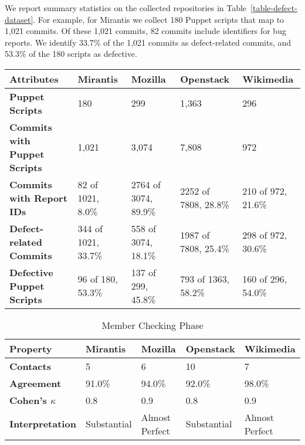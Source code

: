 \documentclass[smallextended]{svjour3}       %
\begin{document}

We report summary statistics on the collected repositories in Table~\ref{table-defect-dataset}. For example, for Mirantis we collect 180 Puppet scripts that map to 1,021 commits. Of these 1,021 commits, 82 commits include identifiers for bug reports. We identify 33.7\% of the 1,021 commits as defect-related commits, and 53.3\% of the 180 scripts as defective.   

\begin{table*}[]
\centering
\caption{Statistics of Four Datasets}
\label{table-defect-dataset}
{\footnotesize
\begin{tabular}{ p{2.5cm} p{1.8cm} p{1.8cm} p{1.8cm} p{1.8cm} }
\hline
\textbf{Attributes}  & Mirantis & Mozilla & Openstack & Wikimedia \\
\hline
\textbf{Puppet Scripts} & 180 & 299  & 1,363 & 296 \\
\textbf{Commits with Puppet Scripts} & 1,021  & 3,074  & 7,808  & 972  \\
\textbf{Commits with Report IDs} & 82  of 1021, 8.0\% & 2764 of 3074, 89.9\% & 2252 of 7808, 28.8\% & 210 of 972, 21.6\% \\
\textbf{Defect-related Commits} &  344 of 1021, 33.7\% & 558 of 3074, 18.1\%  & 1987 of 7808, 25.4\% & 298 of 972, 30.6\% \\
\textbf{Defective Puppet Scripts} & 96 of 180, 53.3\% & 137 of 299, 45.8\%  & 793 of 1363, 58.2\% & 160 of 296, 54.0\% \\
\hline
\end{tabular}
}
\end{table*}

\begin{table}[]
\centering
\setlength\abovecaptionskip{-1pt}
\caption{Member Checking Phase}
\label{table-dataset-practitioner}
{\footnotesize
\begin{tabular}{ p{2cm} p{1.35cm} p{1.25cm} p{1.35cm} p{1.25cm} }
\hline
\textbf{Property}              & Mirantis & Mozilla & Openstack & Wikimedia \\
\hline
\textbf{Contacts}              & 5      & 6      & 10     & 7 \\
\textbf{Agreement}             & 91.0\% & 94.0\% & 92.0\% & 98.0\% \\
\textbf{Cohen's $\kappa$}      & 0.8 & 0.9 & 0.8 & 0.9 \\
\textbf{Interpretation}        & Substantial & Almost Perfect & Substantial & Almost Perfect \\
\hline
\end{tabular}
}
\end{table}
\end{document}

